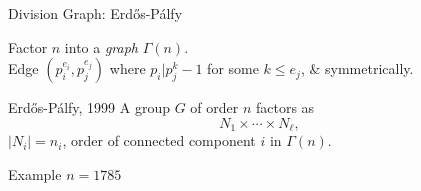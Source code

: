 \documentclass{beamer}
\begin{document}
\begin{frame}{Division Graph: Erd\H{o}s-P\'{a}lfy}

Factor $n$ into a \emph{graph} $\Gamma(n)$.  \\
Edge $(p_i^{e_i},p_j^{e_j})$
where $p_i|p_j^k-1$ for some $k\leq e_j$, \& symmetrically.  

\begin{block}{Erd\H{o}s-P\'{a}lfy, 1999}
    A group $G$ of order $n$ factors as 
\[N_1\times \cdots \times N_{\ell},\] 
$|N_i|=n_i$, order of connected component $i$ in $\Gamma(n)$.
\end{block}

\pause

\begin{block}{Example $n=1785$}
\begin{center}
\end{center}
\end{block}


\end{frame}
    
\end{document}
